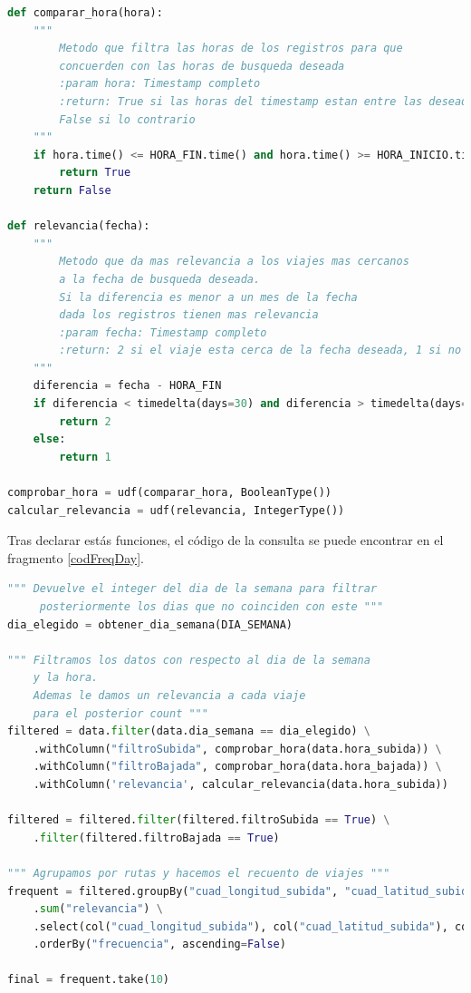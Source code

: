 \begin{lstlisting}[label=udfFreq,language=Python,frame=single,caption=Funciones de usuario para filtrado de la consulta de rutas frecuentes con estacionalidad]
def comparar_hora(hora):
    """
        Metodo que filtra las horas de los registros para que 
        concuerden con las horas de busqueda deseada
        :param hora: Timestamp completo
        :return: True si las horas del timestamp estan entre las deseadas
        False si lo contrario
    """
    if hora.time() <= HORA_FIN.time() and hora.time() >= HORA_INICIO.time():
        return True
    return False

def relevancia(fecha):
    """
        Metodo que da mas relevancia a los viajes mas cercanos
        a la fecha de busqueda deseada.
        Si la diferencia es menor a un mes de la fecha
        dada los registros tienen mas relevancia
        :param fecha: Timestamp completo
        :return: 2 si el viaje esta cerca de la fecha deseada, 1 si no
    """
    diferencia = fecha - HORA_FIN
    if diferencia < timedelta(days=30) and diferencia > timedelta(days=-30):
        return 2
    else:
        return 1

comprobar_hora = udf(comparar_hora, BooleanType())
calcular_relevancia = udf(relevancia, IntegerType())
\end{lstlisting}

\clearpage
Tras declarar estás funciones, el código de la consulta se puede encontrar en el fragmento \ref{codFreqDay}.

\begin{lstlisting}[label=codFreqDay,language=Python,frame=single,caption=Código consulta de diez rutas más frecuentes teniendo en cuenta la estacionalidad]
""" Devuelve el integer del dia de la semana para filtrar
	 posteriormente los dias que no coinciden con este """
dia_elegido = obtener_dia_semana(DIA_SEMANA)

""" Filtramos los datos con respecto al dia de la semana 
    y la hora.
    Ademas le damos un relevancia a cada viaje
    para el posterior count """
filtered = data.filter(data.dia_semana == dia_elegido) \
	.withColumn("filtroSubida", comprobar_hora(data.hora_subida)) \
	.withColumn("filtroBajada", comprobar_hora(data.hora_bajada)) \
	.withColumn('relevancia', calcular_relevancia(data.hora_subida))

filtered = filtered.filter(filtered.filtroSubida == True) \
    .filter(filtered.filtroBajada == True)

""" Agrupamos por rutas y hacemos el recuento de viajes """
frequent = filtered.groupBy("cuad_longitud_subida", "cuad_latitud_subida", "cuad_longitud_bajada", "cuad_latitud_bajada") \
    .sum("relevancia") \
    .select(col("cuad_longitud_subida"), col("cuad_latitud_subida"), col("cuad_longitud_bajada"), col("cuad_latitud_bajada"), col("sum(relevancia)").alias("frecuencia")) \
    .orderBy("frecuencia", ascending=False)

final = frequent.take(10)
\end{lstlisting}

